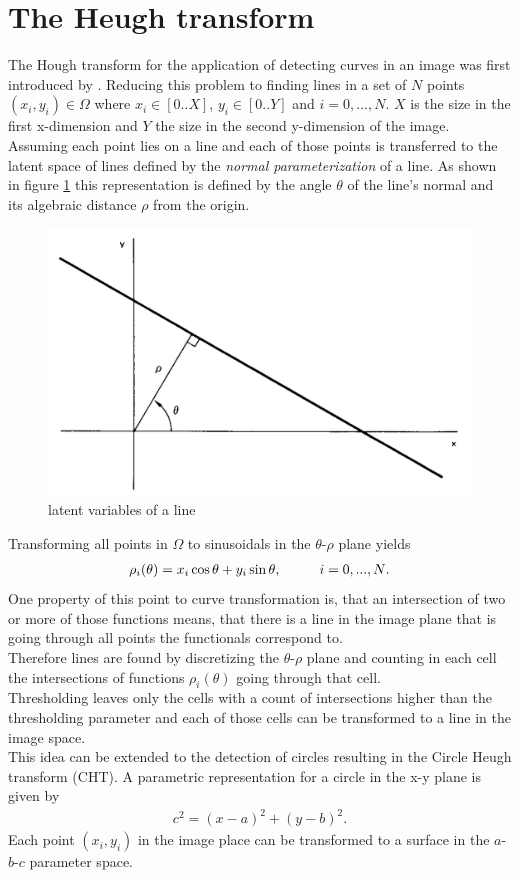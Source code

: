 \section{The Heugh transform}\label{ssec:heugh_tf}
The Hough transform for the application of detecting curves in an image was first introduced by \cite{10.1145/361237.361242}. Reducing this problem to finding lines in a set of $N$ points $(x_i, y_i)\in \Omega$ where $x_i\in [0..X]$, $y_i\in [0..Y]$ and $i = 0, ...,N$. $X$ is the size in the first x-dimension and $Y$ the size in the second y-dimension of the image.\\
Assuming each point lies on a line and each of those points is transferred to the latent space of lines defined by the \emph{normal parameterization} of a line. As shown in figure \ref{fig:norm_line} this representation is defined by the angle $\theta$ of the line's normal and its algebraic distance $\rho$ from the origin.\\

\begin{figure}[ht!]
	\centering
	\includegraphics[width=.5\textwidth]{figures/heugh_line.png}
	\caption{\cite{10.1145/361237.361242} latent variables of a line}
	\label{fig:norm_line}
\end{figure}

Transforming all points in $\Omega$ to sinusoidals in the $\theta$-$\rho$ plane yields
\begin{align}
	\rho_i(\theta) = x_i \cos \theta + y_i \sin \theta \text{, \hspace{8mm} $i = 0, ...,N$}.
\end{align}
One property of this point to curve transformation is, that an intersection of two or more of those functions means, that there is a line in the image plane that is going through all points the functionals correspond to.\\
Therefore lines are found by discretizing the $\theta$-$\rho$ plane and counting in each cell the intersections of functions $\rho_i(\theta)$ going through that cell.\\
Thresholding leaves only the cells with a count of intersections higher than the thresholding parameter and each of those cells can be transformed to a line in the image space.\\
This idea can be extended to the detection of circles resulting in the Circle Heugh transform (CHT). A parametric representation for a circle in the x-y plane is given by 
\begin{align}
	c^2 = (x-a)^2 + (y-b)^2.
\end{align}
Each point $(x_i, y_i)$ in the image place can be transformed to a surface in the $a$-$b$-$c$ parameter space.

